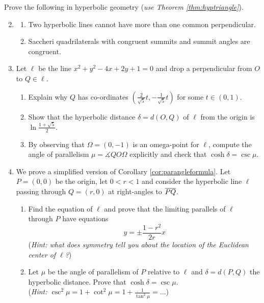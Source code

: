 \begin{exercises}
\exstart Prove the following in hyperbolic geometry (\emph{use Theorem \ref{thm:hyptriangle}}).\par\vspace{-2pt}
\begin{enumerate}\setcounter{enumi}{1}
  \item[]\begin{enumerate}
    \item Two hyperbolic lines cannot have more than one common perpendicular.
    \item\label{exs:saccherisummitcong} Saccheri quadrilaterals with congruent summits and summit angles are congruent.
  \end{enumerate}
  
  \item Let $\ell$ be the line $x^2+y^2-4x+2y+1=0$ and drop a perpendicular from $O$ to $Q\in\ell$.
  \begin{enumerate}
    \item Explain why $Q$ has co-ordinates $(\frac 2{\sqrt 5}t,-\frac 1{\sqrt 5}t)$ for some $t\in(0,1)$.
    \item Show that the hyperbolic distance $\delta=d(O,Q)$ of $\ell$ from the origin is $\ln\frac{1+\sqrt 5}2$.
    \item By observing that $\Omega=(0,-1)$ is an omega-point for $\ell$, compute the angle of parallelism $\mu=\measuredangle QO\Omega$ explicitly and check that $\cosh\delta=\csc\mu$.
	\end{enumerate}
    
	\item\label{exs:angparallelism} We prove a simplified version of Corollary \ref{cor:parangleformula}.
	Let $P=(0,0)$ be the origin, let $0<r<1$ and consider the hyperbolic line $\ell$ passing through $Q=(r,0)$ at right-angles to $\overline{PQ}$.
  \begin{enumerate}
    \item Find the equation of $\ell$ and prove that the limiting parallels of $\ell$ through $P$ have equations
    \[y=\pm\frac{1-r^2}{2r}x\]
    (\emph{Hint: what does symmetry tell you about the location of the Euclidean center of $\ell$?})
    \item Let $\mu$ be the angle of parallelism of $P$ relative to $\ell$ and $\delta=d(P,Q)$ the hyperbolic distance. Prove that $\cosh\delta=\csc\mu$.\\
    (\emph{Hint: $\csc^2\!\mu=1+\cot^2\!\mu=1+\frac 1{\tan^2\!\mu}=\ldots$})
  \end{enumerate}
  

\end{enumerate}
\end{exercises}
